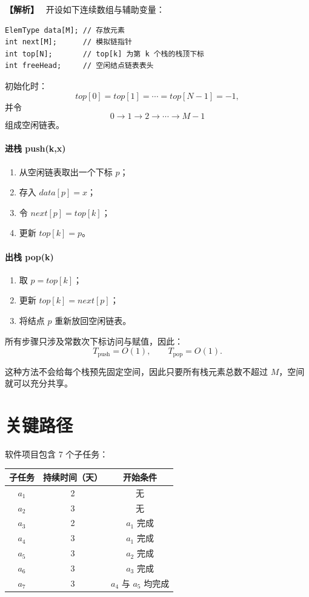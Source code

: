 \documentclass[12pt,a4paper]{ctexart}
\newenvironment{solution}
{\par\noindent\textbf{\color{answerblue}【解析】}\ }
{\par}
\begin{document}
\begin{solution}
开设如下连续数组与辅助变量：
\begin{lstlisting}
ElemType data[M]; // 存放元素
int next[M];      // 模拟链指针
int top[N];       // top[k] 为第 k 个栈的栈顶下标
int freeHead;     // 空闲结点链表表头
\end{lstlisting}

初始化时：
\[
top[0]=top[1]=\cdots=top[N-1]=-1,
\]
并令
\[
0\to1\to2\to\cdots\to M-1
\]
组成空闲链表。

\paragraph{进栈 push(k,x)}
\begin{enumerate}
  \item 从空闲链表取出一个下标 $p$；
  \item 存入 $data[p]=x$；
  \item 令 $next[p]=top[k]$；
  \item 更新 $top[k]=p$。
\end{enumerate}

\paragraph{出栈 pop(k)}
\begin{enumerate}
  \item 取 $p=top[k]$；
  \item 更新 $top[k]=next[p]$；
  \item 将结点 $p$ 重新放回空闲链表。
\end{enumerate}

所有步骤只涉及常数次下标访问与赋值，因此：
\[
\boxed{T_{\mathrm{push}}=O(1),\qquad T_{\mathrm{pop}}=O(1)}.
\]

这种方法不会给每个栈预先固定空间，因此只要所有栈元素总数不超过 $M$，空间就可以充分共享。
\end{solution}

\section{关键路径}

软件项目包含 7 个子任务：

\begin{center}
\begin{tabular}{ccc}
\toprule
子任务 & 持续时间（天） & 开始条件\\
\midrule
$a_1$ & 2 & 无\\
$a_2$ & 3 & 无\\
$a_3$ & 2 & $a_1$ 完成\\
$a_4$ & 3 & $a_1$ 完成\\
$a_5$ & 3 & $a_2$ 完成\\
$a_6$ & 3 & $a_3$ 完成\\
$a_7$ & 3 & $a_4$ 与 $a_5$ 均完成\\
\bottomrule
\end{tabular}
\end{center}
\end{document}
